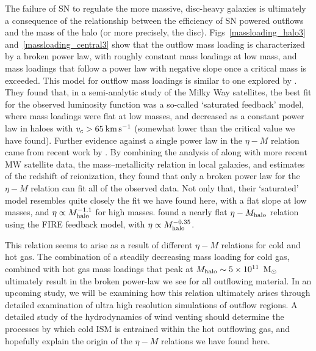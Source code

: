 The failure of SN to regulate the more massive, disc-heavy galaxies is
ultimately a consequence of the relationship between the efficiency of SN
powered outflows and the mass of the halo (or more precisely, the disc).
Figs~\ref{massloading_halo3} and~\ref{massloading_central3} show that the
outflow mass loading is characterized by a broken power law, with roughly
constant mass loadings at low mass, and mass loadings that follow a power law
with negative slope once a critical mass is exceeded.  This model for outflow
mass loadings is similar to one explored by \citet{Font2011}.  They found that,
in a semi-analytic study of the Milky Way satellites, the best fit for the
observed luminosity function was a so-called `saturated feedback' model, where
mass loadings were flat at low masses, and decreased as a constant power law in
haloes with $v_c>65\>{\rm km}\,{\rm s}^{-1}$ (somewhat lower than the critical value we have
found).  Further evidence against a single power law in the $\eta-M$ relation
came from recent work by \citet{Hou2015}.  By combining the analysis of
\citet{Font2011} along with more recent MW satellite data, the mass--metallicity
relation in local galaxies, and estimates of the redshift of reionization, they
found that only a broken power law for the $\eta-M$ relation can fit all of the
observed data.  Not only that, their `saturated' model resembles quite closely
the fit we have found here, with a flat slope at low masses, and $\eta\propto
M_{\rm halo}^{-1.1}$ for high masses.
\citet{Muratov2015} found a nearly flat $\eta-M_{\rm halo}$ relation
using the FIRE feedback model, with $\eta\propto M_{\rm halo}^{-0.35}$.

This relation seems to arise as a result of different $\eta-M$ relations for
cold and hot gas.  The combination of a steadily decreasing mass loading for
cold gas, combined with hot gas mass loadings that peak at
$M_{\rm halo}\sim5\times10^{11}\;\>{\rm M_{\odot}}$ ultimately result in the broken power-law
we see for all outflowing material.  In an upcoming study, we will be examining
how this relation ultimately arises through detailed examination of ultra high
resolution simulations of outflow regions.  A detailed study of the
hydrodynamics of wind venting should determine the processes by which cold ISM
is entrained within the hot outflowing gas, and hopefully explain the origin of
the $\eta-M$ relations we have found here.

